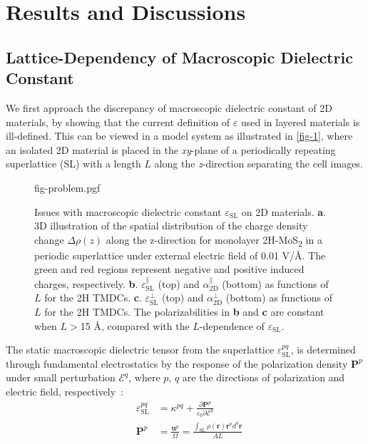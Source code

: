 
\section{Results and Discussions}
\label{sec:diel-results-discussions}

\subsection{Lattice-Dependency of Macroscopic Dielectric Constant}
\label{sec:diel-latt-depend-macr}

We first approach the discrepancy of macroscopic dielectric constant
of 2D materials, by showing that the current definition of
$\varepsilon$ used in layered materials is ill-defined.  This can be
viewed in a model system as illustrated
in \autoref{fig-1}, where an isolated 2D material is placed in
the \textit{xy}-plane of a periodically repeating superlattice (SL)
with a length $L$ along the \textit{z}-direction separating the cell
images.%
\begin{figure}[!htbp]
\centering
{fig-problem.pgf}
\caption{\label{fig-1} %
  Issues with macroscopic dielectric constant
  $\varepsilon_{\mathrm{SL}}$ on 2D materials.  \textbf{a}. 3D
  illustration of the spatial distribution of the charge density
  change $\Delta \rho(z)$ along the z-direction for monolayer
  2H-MoS\textsubscript{2} in a periodic superlattice under external
  electric field of 0.01 V/\AA{}.  The green and red regions represent
  negative and positive induced charges, respectively.
  \textbf{b}.  $\varepsilon^{\parallel}_{\mathrm{SL}}$ (top) and
  $\alpha_{\mathrm{2D}}^{\parallel}$ (bottom) as functions of $L$ for
  the 2H TMDCs. \textbf{c}.  $\varepsilon^{\perp}_{\mathrm{SL}}$ (top)
  and $\alpha_{\mathrm{2D}}^{\perp}$ (bottom) as functions of $L$ for
  the 2H TMDCs. The polarizabilities in \textbf{b} and \textbf{c} are
  constant when $L>$15 \AA{}, compared with the $L$-dependence of
  $\varepsilon_{\mathrm{SL}}$. }
\end{figure}
%
The static macroscopic dielectric tensor from the superlattice
$\varepsilon_{\mathrm{SL}}^{pq}$, is determined through fundamental
electrostatics by the response of the polarization density
$\symbf{P}^{p}$ under small perturbation
$\mathscr{E}^{q}$, where $p$, $q$ are the directions of
polarization and electric field,
respectively~\autocite{Dressel_2001_electrodynamics}:
\begin{subequations}
  \begin{eqnarray}
      \label{eq:diele-def-eps-1}
    &\varepsilon_{\mathrm{SL}}^{pq} &= \kappa^{pq} +
                                 {\displaystyle \frac{\partial \symbf{P}^{p}}
                                 {\varepsilon_{0} \partial \mathscr{E}^{q}}} \\
          \label{eq:diele-def-eps-2}
    &\symbf{P}^{p} &=  {\displaystyle \frac{\symbf{u}^{p}}{\Omega}}
                          = {\displaystyle \frac{{\displaystyle
          \int_{\mathrm{SL}} \rho(\symbf{r}) \symbf{r}^{p} d^{3}\symbf{r}}}
                          {AL}}
  \end{eqnarray}
\end{subequations}
